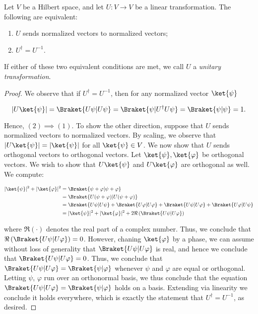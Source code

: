\begin{prop}\label{unitary equivilance} Let $V$ be a Hilbert space, and let $U:V\to V$ be a linear transformation. The following are equivalent:

\begin{enumerate}
\item $U$ sends normalized vectors to normalized vectors;
\item $U^{\dagger}=U^{-1}$.
\end{enumerate}

If either of these two equivalent conditions are met, we call $U$ a {\em unitary transformation}.
\end{prop}
\begin{proof} We observe that if $U^\dagger=U^{-1}$, then for any normalized vector $\ket{\psi}$

$$|U\ket{\psi}|=\Braket{U \psi | U \psi}=\Braket{\psi | U^\dagger U \psi}=\Braket{\psi | \psi} =1.$$

Hence, $(2)\implies (1)$. To show the other direction, suppose that $U$ sends normalized vectors to normalized vectors. By scaling, we observe that $|U\ket{\psi}|=|\ket{\psi}|$ for all $\ket{\psi}\in V$. We now show that $U$ sends orthogonal vectors to orthogonal vectors. Let $\ket{\psi},\ket{\varphi}$ be orthogonal vectors. We wish to show that $U\ket{\psi}$ and $U\ket{\varphi}$ are orthogonal as well. We compute:

\begin{align*}
|\ket{\psi}|^2+|\ket{\varphi}|^2&=\Braket{\psi+\varphi | \psi+ \varphi}\\
&=\Braket{U(\psi+\varphi) | U(\psi+ \varphi)}\\
&=\Braket{U\psi | U\psi}+\Braket{U\varphi | U \varphi}+\Braket{U\psi | U\varphi}+\Braket{U\varphi | U\psi}\\
&=|\ket{\psi}|^2+|\ket{\varphi}|^2+2\Re\left(\Braket{U\psi | U\varphi}\right)\\
\end{align*}

where $\Re(\cdot)$ denotes the real part of a complex number. Thus, we conclude that $\Re\left(\Braket{U\psi | U\varphi}\right)=0$. However, chaning $\ket{\varphi}$ by a phase, we can assume without loss of generality that $\Braket{U\psi | U\varphi}$ is real, and hence we conclude that $\Braket{U\psi | U\varphi}=0$. Thus, we conclude that $\Braket{U\psi | U\varphi}=\Braket{\psi | \varphi}$ whenever $\psi$ and $\varphi$ are equal or orthogonal. Letting $\psi$, $\varphi$ run over an orthonormal basis, we thus conclude that the equation $\Braket{U\psi | U\varphi}=\Braket{\psi | \varphi}$ holds on a basis. Extending via linearity we conclude it holds everywhere, which is exactly the statement that $U^\dagger=U^{-1}$, as desired. 
\end{proof}

